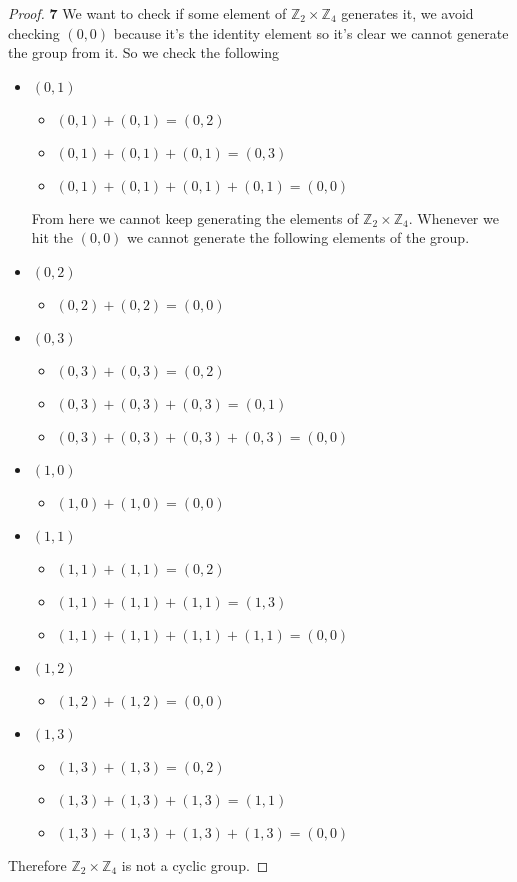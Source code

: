 \documentclass[11pt]{article}
\begin{document}
	\begin{proof}{\textbf{7}}
		We want to check if some element of $\mathbb{Z}_2 \times \mathbb{Z}_4$ generates it, we avoid checking $(0,0)$ because it's the identity element so it's clear we cannot generate the group from it. So we check the following
		\begin{itemize}
			\item $(0,1)$
				\begin{itemize}
					\item[] $(0,1)+(0,1) = (0,2)$
					\item[] $(0,1)+(0,1)+(0,1) = (0,3)$
					\item[] $(0,1)+(0,1)+(0,1)+(0,1) = (0,0)$
				\end{itemize}
			From here we cannot keep generating the elements of $\mathbb{Z}_2 \times \mathbb{Z}_4$. Whenever we hit the $(0,0)$ we cannot generate the following elements of the group.
			\item $(0,2)$
				\begin{itemize}
					\item[] $(0,2)+(0,2) = (0,0)$
				\end{itemize}
			\item $(0,3)$
				\begin{itemize}
					\item[] $(0,3)+(0,3) = (0,2)$
					\item[] $(0,3)+(0,3)+(0,3) = (0,1)$					
					\item[] $(0,3)+(0,3)+(0,3)+(0,3) = (0,0)$
				\end{itemize}
			\item $(1,0)$
				\begin{itemize}
					\item[] $(1,0)+(1,0) = (0,0)$
				\end{itemize}
			\item $(1,1)$
				\begin{itemize}
					\item[] $(1,1)+(1,1) = (0,2)$
					\item[] $(1,1)+(1,1)+(1,1) = (1,3)$
					\item[] $(1,1)+(1,1)+(1,1)+(1,1) = (0,0)$
				\end{itemize}
			\item $(1,2)$
				\begin{itemize}
					\item[] $(1,2)+(1,2) = (0,0)$
				\end{itemize}
			\item $(1,3)$
				\begin{itemize}
					\item[] $(1,3)+(1,3) = (0,2)$
					\item[] $(1,3)+(1,3)+(1,3) = (1,1)$
					\item[] $(1,3)+(1,3)+(1,3)+(1,3) = (0,0)$
				\end{itemize}
		\end{itemize}
		Therefore $\mathbb{Z}_2 \times \mathbb{Z}_4$ is not a cyclic group.
	\end{proof}
\end{document}
